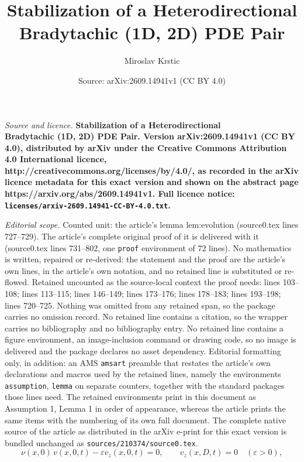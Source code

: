 \documentclass[10pt,a4paper]{amsart}
\title{\bfseries Stabilization of a Heterodirectional\\ Bradytachic (1D, 2D) PDE Pair}
\author{Miroslav Krstic}
\date{Source: arXiv:2609.14941v1 (CC BY 4.0)}
\begin{document}
\maketitle

\noindent\emph{Source and licence.} \bfseries Stabilization of a Heterodirectional\\ Bradytachic (1D, 2D) PDE Pair. Version arXiv:2609.14941v1 (CC BY 4.0), distributed by arXiv under the Creative Commons Attribution 4.0 International licence, http://creativecommons.org/licenses/by/4.0/, as recorded in the arXiv licence metadata for this exact version and shown on the abstract page https://arxiv.org/abs/2609.14941v1. Full licence notice: \texttt{licenses/arxiv-2609.14941-CC-BY-4.0.txt}.\par\smallskip

\noindent\textit{Editorial scope.} Counted unit: the article's lemma lem:evolution (source0.tex lines 727--729). The article's complete original proof of it is delivered with it (source0.tex lines 731--802, one \texttt{proof} environment of 72 lines). No mathematics is written, repaired or re-derived: the statement and the proof are the article's own lines, in the article's own notation, and no retained line is substituted or re-flowed.  Retained uncounted as the source-local context the proof needs: lines 103--108; lines 113--115; lines 146--149; lines 173--176; lines 178--183; lines 193--198; lines 720--725.  Nothing was omitted from any retained span, so the package carries no omission record.  No retained line contains a citation, so the wrapper carries no bibliography and no bibliography entry.  No retained line contains a figure environment, an image-inclusion command or drawing code, so no image is delivered and the package declares no asset dependency.  Editorial formatting only, in addition: an AMS \texttt{amsart} preamble that restates the article's own declarations and macros used by the retained lines, namely the environments \texttt{assumption}, \texttt{lemma} on separate counters, together with the standard packages those lines need.  The retained environments print in this document as Assumption 1, Lemma 1 in order of appearance, whereas the article prints the same items with the numbering of its own full document.  The complete native source of the article as distributed in the arXiv e-print for this exact version is bundled unchanged as \texttt{sources/210374/source0.tex}.
\begin{equation}
 \nu(x,0)\,v(x,0,t)-\varepsilon v_z(x,0,t)=0,
 \qquad
 v_z(x,D,t)=0\quad(\varepsilon>0),
 \label{eq:gen-zbc}
\end{equation}
\end{document}
